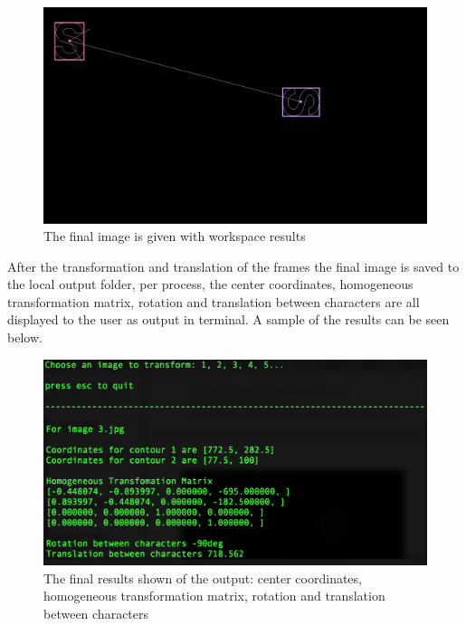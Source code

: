 \documentclass[a4paper, 10pt]{article}
\begin{document}
\begin{figure}[H]
  \includegraphics[width=\linewidth]{images/F3}
  \caption{The final image is given with workspace results}
  \label{fig:The final image is given with workspace results}
\end{figure}

After the transformation and translation of the frames the final image is saved to the local output folder, per process, the center coordinates, homogeneous transformation matrix, rotation and translation between characters are all displayed to the user as output in terminal. A sample of the results can be seen below.

\begin{figure}[H]
  \includegraphics[width=\linewidth]{images/shell}
  \caption{The final results shown of the output: center coordinates, homogeneous transformation matrix, rotation and translation between characters}
  \label{fig:Final Results Shell}
\end{figure}

\end{document}
